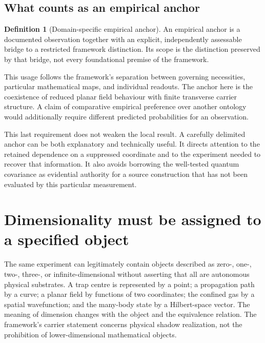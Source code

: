 \documentclass[11pt,a4paper]{article}
\theoremstyle{definition}
\newtheorem{definition}[proposition]{Definition}
\theoremstyle{remark}
\begin{document}
\subsection{What counts as an empirical anchor}
\begin{definition}[Domain-specific empirical anchor]
An empirical anchor is a documented observation together with an explicit, independently assessable bridge to a restricted framework distinction. Its scope is the distinction preserved by that bridge, not every foundational premise of the framework.
\end{definition}
This usage follows the framework's separation between governing necessities, particular mathematical maps, and individual readouts. The anchor here is the coexistence of reduced planar field behaviour with finite transverse carrier structure. A claim of comparative empirical preference over another ontology would additionally require different predicted probabilities for an observation.\cite{foundation,planck}

This last requirement does not weaken the local result. A carefully delimited anchor can be both explanatory and technically useful. It directs attention to the retained dependence on a suppressed coordinate and to the experiment needed to recover that information. It also avoids borrowing the well-tested quantum covariance as evidential authority for a source construction that has not been evaluated by this particular measurement.

\section{Dimensionality must be assigned to a specified object}
\label{sec:types}
The same experiment can legitimately contain objects described as zero-, one-, two-, three-, or infinite-dimensional without asserting that all are autonomous physical substrates. A trap centre is represented by a point; a propagation path by a curve; a planar field by functions of two coordinates; the confined gas by a spatial wavefunction; and the many-body state by a Hilbert-space vector. The meaning of dimension changes with the object and the equivalence relation. The framework's carrier statement concerns physical shadow realization, not the prohibition of lower-dimensional mathematical objects.\cite{foundation,planck}
\end{document}
